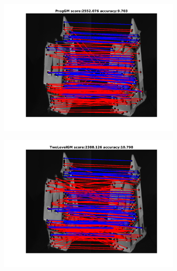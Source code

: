 \documentclass[
	fontsize=12pt,
	paper=a4,
	twoside=false,
	numbers=noenddot,
	plainheadsepline,
	toc=listof,
	toc=bibliography
]{scrartcl}
\begin{document}
\begin{figure}[h] 		
	\begin{subfigure}[b]{0.3\textwidth}
		\centering
		\includegraphics[scale=0.25]{"fig_ver2608/RealImages/HouseSeq/no_descr/using_cpd_afftrafo/solution/fi_4_ProgGM"}  
	\end{subfigure}%
	\begin{subfigure}[b]{0.3\textwidth}
		\centering
		\includegraphics[scale=0.25]{"fig_ver2608/RealImages/HouseSeq/no_descr/using_cpd_afftrafo/solution/fi_4_TwoLevelGM"}  
	\end{subfigure} 
	\begin{subfigure}[b]{0.3\textwidth}
		\centering

\end{subfigure}
\end{figure}
\end{document}

